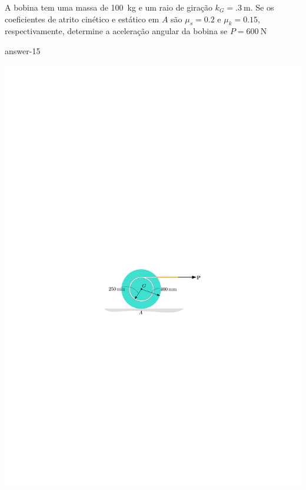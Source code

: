 \item A bobina tem uma massa de \SI{100}{\kilogram} e um raio de giração $k_{G}=\SI{.3}{\meter}$. Se os coeficientes de atrito cinético e estático em $A$ são $\mu_{s}=0.2$ e $\mu_{k}=0.15$, respectivamente, determine a aceleração angular da bobina se $P=\SI{600}{\newton}$

{answer-15}

\begin{flushleft}
	\includegraphics[scale=1.2]{../../images/draw_10_1}
\end{flushleft}